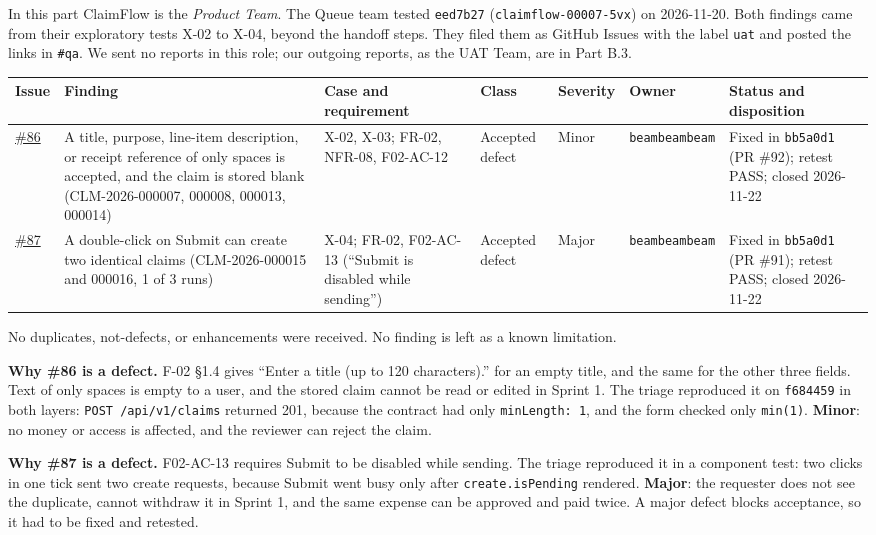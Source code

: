 In this part ClaimFlow is the \emph{Product Team}. The Queue team tested \texttt{eed7b27} (\texttt{claimflow-00007-5vx}) on 2026-11-20.
Both findings came from their exploratory tests X-02 to X-04, beyond the handoff steps.
They filed them as GitHub Issues with the label \texttt{uat} and posted the links in \texttt{\#qa}.
We sent no reports in this role; our outgoing reports, as the UAT Team, are in Part B.3.


\begin{longtable}{@{}R{0.9cm}R{3.6cm}R{2.1cm}R{1.5cm}R{1.3cm}R{2.6cm}R{2.4cm}@{}}
\toprule \textbf{Issue} & \textbf{Finding} & \textbf{Case and requirement} & \textbf{Class} & \textbf{Severity} & \textbf{Owner} & \textbf{Status and disposition} \\ \midrule \endhead
\href{https://github.com/beambeambeam/claimflow/issues/86}{\#86} & A title, purpose, line-item description, or receipt reference of only spaces is accepted, and the claim is stored blank (CLM-2026-000007, 000008, 000013, 000014) & X-02, X-03; FR-02, NFR-08, F02-AC-12 & Accepted defect & Minor & \texttt{beambeambeam} & Fixed in \texttt{bb5a0d1} (PR \#92); retest PASS; closed 2026-11-22 \\
\href{https://github.com/beambeambeam/claimflow/issues/87}{\#87} & A double-click on Submit can create two identical claims (CLM-2026-000015 and 000016, 1 of 3 runs) & X-04; FR-02, F02-AC-13 (``Submit is disabled while sending'') & Accepted defect & Major & \texttt{beambeambeam} & Fixed in \texttt{bb5a0d1} (PR \#91); retest PASS; closed 2026-11-22 \\
\bottomrule
\end{longtable}

No duplicates, not-defects, or enhancements were received.
No finding is left as a known limitation.

\textbf{Why \#86 is a defect.} F-02 §1.4 gives ``Enter a title (up to 120 characters).'' for an empty title, and the same for the other three fields. Text of only spaces is empty to a user, and the stored claim cannot be read or edited in Sprint 1.
The triage reproduced it on \texttt{f684459} in both layers: \texttt{POST /api/v1/claims} returned 201, because the contract had only \texttt{minLength: 1}, and the form checked only \texttt{min(1)}.
\textbf{Minor}: no money or access is affected, and the reviewer can reject the claim.

\textbf{Why \#87 is a defect.} F02-AC-13 requires Submit to be disabled while sending.
The triage reproduced it in a component test: two clicks in one tick sent two create requests, because Submit went busy only after \texttt{create.isPending} rendered.
\textbf{Major}: the requester does not see the duplicate, cannot withdraw it in Sprint 1, and the same expense can be approved and paid twice. A major defect blocks acceptance, so it had to be fixed and retested.

